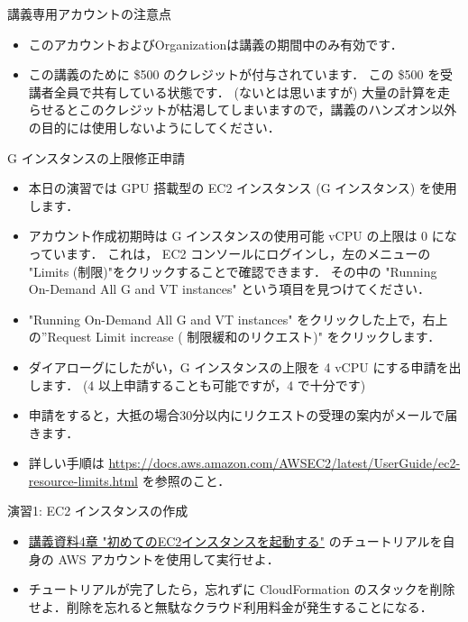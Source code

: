 \documentclass[unicode,11pt]{beamer}
\begin{document}
\begin{frame}{講義専用アカウントの注意点}

\begin{itemize}
    \item このアカウントおよびOrganizationは講義の期間中のみ有効です．
    \item この講義のために \$500 のクレジットが付与されています．
    この \$500 を受講者全員で共有している状態です．
    (ないとは思いますが) 大量の計算を走らせるとこのクレジットが枯渇してしまいますので，講義のハンズオン以外の目的には使用しないようにしてください．
\end{itemize}

\end{frame}

\begin{frame}{G インスタンスの上限修正申請}

\begin{itemize}
    \item 本日の演習では GPU 搭載型の EC2 インスタンス (G インスタンス) を使用します．
    \item アカウント作成初期時は G インスタンスの使用可能 vCPU の上限は 0 になっています．
    これは， EC2 コンソールにログインし，左のメニューの "Limits (制限)"をクリックすることで確認できます．
    その中の "Running On-Demand All G and VT instances" という項目を見つけてください．
    \item "Running On-Demand All G and VT instances" をクリックした上で，右上の”Request Limit increase (
    制限緩和のリクエスト)" をクリックします．
    \item ダイアローグにしたがい，G インスタンスの上限を 4 vCPU にする申請を出します．
    (4 以上申請することも可能ですが，4 で十分です)
    \item 申請をすると，大抵の場合30分以内にリクエストの受理の案内がメールで届きます．
    \item 詳しい手順は
    \url{https://docs.aws.amazon.com/AWSEC2/latest/UserGuide/ec2-resource-limits.html}
    を参照のこと．
\end{itemize}

\end{frame}

\begin{frame}{演習1: EC2 インスタンスの作成}

\begin{itemize}
    \item \href{https://tomomano.github.io/learn-aws-by-coding/#sec_first_ec2}{講義資料4章 "初めてのEC2インスタンスを起動する"} のチュートリアルを自身の AWS アカウントを使用して実行せよ．
    \item チュートリアルが完了したら，忘れずに CloudFormation のスタックを削除せよ．削除を忘れると無駄なクラウド利用料金が発生することになる．
\end{itemize}

\end{frame}
\end{document}
